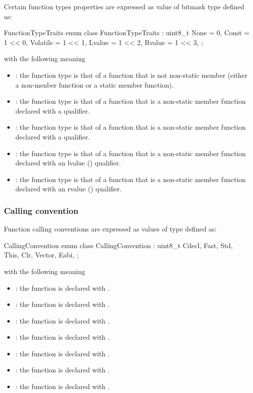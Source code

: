 Certain function types properties are expressed as value of bitmask type  defined as:
%
\begin{typedef}{FunctionTypeTraits}{}
	enum class FunctionTypeTraits : uint8_t {
		None			= 0,
		Const			= 1 << 0,
		Volatile			= 1 << 1,
		Lvalue			= 1 << 2,
		Rvalue			= 1 << 3,
	};
\end{typedef}
%
with the following meaning
\begin{itemize}
	\item {}: the function type is that of a function that is not non-static member (either a non-menber function
		or a static member function).
	\item {}: the function type is that of a function that is a non-static member function declared with a 
		qualifier.
	\item {}: the function type is that of a function that is a non-static member function declared with a 
		qualifier.
	\item {}: the function type is that of a function that is a non-static member function declared with an lvalue (\code{\&})
		qualifier.
	\item {}: the function type is that of a function that is a non-static member function declared with an rvalue (\code{\&\&})
		qualifier.
\end{itemize}


\subsubsection{Calling convention}
\label{sec:ifc-calling-convention}

Function calling conventions are expressed as values of type  defined as:
%
\begin{typedef}{CallingConvention}{}
	enum class CallingConvention : uint8_t {
		Cdecl,
		Fast,
		Std,
		This,
		Clr,
		Vector,
		Eabi,
	};
\end{typedef}
%
with the following meaning
\begin{itemize}
	\item {}: the function is declared with .
	\item {}: the function is declared with .
	\item {}: the function is declared with .
	\item {}: the function is declared with .
	\item {}: the function is declared with .
	\item {}: the function is declared with .
	\item {}: the function is declared with .
\end{itemize}



